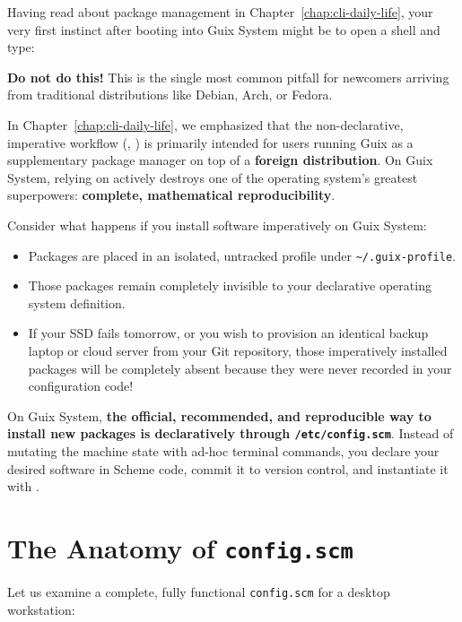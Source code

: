 Having read about package management in Chapter~\ref{chap:cli-daily-life}, your very first instinct after booting into Guix System might be to open a shell and type:
\begin{center}
\end{center}

\textbf{Do not do this!} This is the single most common pitfall for newcomers arriving from traditional distributions like Debian, Arch, or Fedora.

In Chapter~\ref{chap:cli-daily-life}, we emphasized that the non-declarative, imperative workflow (, ) is primarily intended for users running Guix as a supplementary package manager on top of a \textbf{foreign distribution}. On Guix System, relying on  actively destroys one of the operating system's greatest superpowers: \textbf{complete, mathematical reproducibility}.

Consider what happens if you install software imperatively on Guix System:
\begin{itemize}
  \item Packages are placed in an isolated, untracked profile under \texttt{\textasciitilde/.guix-profile}.
  \item Those packages remain completely invisible to your declarative operating system definition.
  \item If your SSD fails tomorrow, or you wish to provision an identical backup laptop or cloud server from your Git repository, those imperatively installed packages will be completely absent because they were never recorded in your configuration code!
\end{itemize}

On Guix System, \textbf{the official, recommended, and reproducible way to install new packages is declaratively through \texttt{/etc/config.scm}}. Instead of mutating the machine state with ad-hoc terminal commands, you declare your desired software in Scheme code, commit it to version control, and instantiate it with .

\section{The Anatomy of \texttt{config.scm}}

Let us examine a complete, fully functional \texttt{config.scm} for a desktop workstation:


